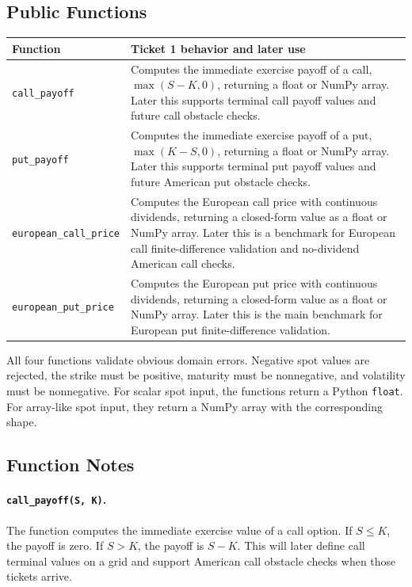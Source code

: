 \documentclass[11pt,a4paper]{article}
\newcommand{\code}[1]{\texttt{#1}}
\begin{document}
\subsection{Public Functions}

\begin{longtable}{P{0.38\textwidth}L{0.54\textwidth}}
\toprule
Function & Ticket 1 behavior and later use \\
\midrule
\endhead
\code{call\_payoff} &
Computes the immediate exercise payoff of a call, \(\max(S-K,0)\), returning a float or NumPy array. Later this supports terminal call payoff values and future call obstacle checks. \\
\code{put\_payoff} &
Computes the immediate exercise payoff of a put, \(\max(K-S,0)\), returning a float or NumPy array. Later this supports terminal put payoff values and future American put obstacle checks. \\
\code{european\_call\_price} &
Computes the European call price with continuous dividends, returning a closed-form value as a float or NumPy array. Later this is a benchmark for European call finite-difference validation and no-dividend American call checks. \\
\code{european\_put\_price} &
Computes the European put price with continuous dividends, returning a closed-form value as a float or NumPy array. Later this is the main benchmark for European put finite-difference validation. \\
\bottomrule
\end{longtable}

All four functions validate obvious domain errors. Negative spot values are rejected, the strike
must be positive, maturity must be nonnegative, and volatility must be nonnegative. For scalar
spot input, the functions return a Python \code{float}. For array-like spot input, they return a
NumPy array with the corresponding shape.

\subsection{Function Notes}

\paragraph{\code{call\_payoff(S, K)}.}
The function computes the immediate exercise value of a call option. If \(S\leq K\), the payoff is
zero. If \(S>K\), the payoff is \(S-K\). This will later define call terminal values on a grid and
support American call obstacle checks when those tickets arrive.
\end{document}
